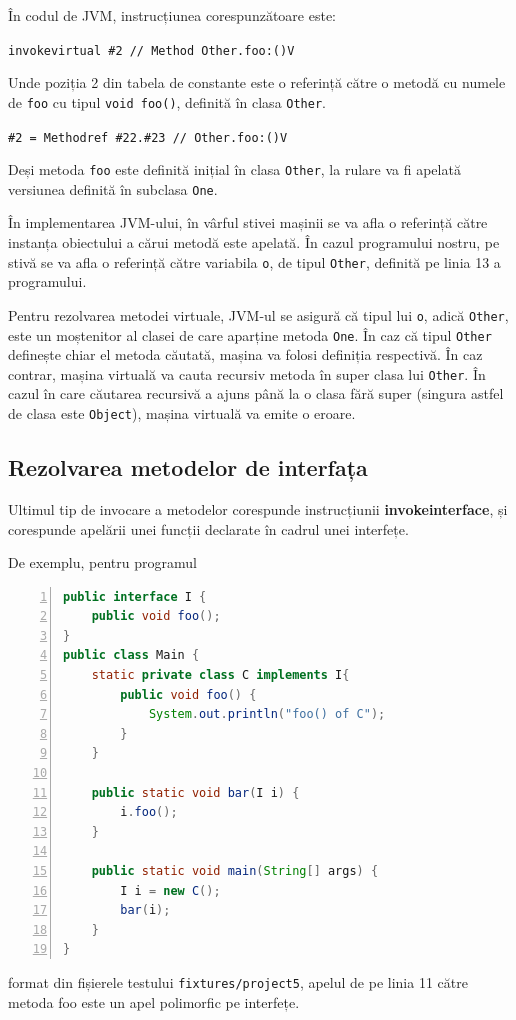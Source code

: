 În codul de JVM, instrucțiunea corespunzătoare este:

\texttt{invokevirtual \#2                  // Method Other.foo:()V}

Unde poziția 2 din tabela de constante este o referință către o metodă cu numele
de \texttt{foo} cu tipul \texttt{void foo()}, definită în clasa \texttt{Other}.

\texttt{\#2 = Methodref          \#22.\#23        // Other.foo:()V}

Deși metoda \texttt{foo} este definită inițial în clasa \texttt{Other}, la
rulare va fi apelată versiunea definită în subclasa \texttt{One}.

În implementarea JVM-ului, în vârful stivei mașinii se va afla o referință către instanța obiectului
a cărui metodă este apelată. În cazul programului nostru, pe stivă se va afla o
referință către variabila \texttt{o}, de tipul \texttt{Other}, definită pe linia
13 a programului.

Pentru rezolvarea metodei virtuale, JVM-ul se asigură că tipul lui \texttt{o},
adică \texttt{Other}, este un moștenitor al clasei de care aparține metoda
\texttt{One}. În caz că tipul \texttt{Other} definește chiar el metoda
căutată, mașina va folosi definiția respectivă.
În caz contrar, mașina virtuală va cauta recursiv metoda în super clasa lui
\texttt{Other}. În cazul în care căutarea recursivă a ajuns până la o clasa fără
super (singura astfel de clasa este \texttt{Object}), mașina virtuală va emite o
eroare.

\subsection{Rezolvarea metodelor de interfața}

Ultimul tip de invocare a metodelor corespunde instrucțiunii
\textbf{invokeinterface}, și corespunde apelării unei funcții declarate în cadrul
unei interfețe.

De exemplu, pentru programul
\begin{lstlisting}[language=Java, numbers=left]
public interface I {
    public void foo();
}
public class Main {
    static private class C implements I{
        public void foo() {
            System.out.println("foo() of C");
        }
    }

    public static void bar(I i) {
        i.foo();
    }

    public static void main(String[] args) {
        I i = new C();
        bar(i);
    }
}
\end{lstlisting}
format din fișierele testului \texttt{fixtures/project5},
apelul de pe linia 11 către metoda foo este un apel polimorfic pe interfețe.

